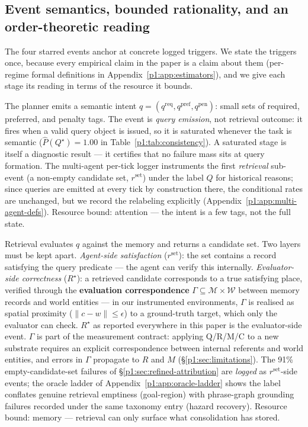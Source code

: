 \documentclass{article}
\begin{document}
\subsection{Event semantics, bounded rationality, and an order-theoretic reading}
\label{p1:sec:event-semantics}

The four starred events anchor at concrete logged triggers. We state the triggers once, because every empirical claim in the paper is a claim about them (per-regime formal definitions in Appendix~\ref{p1:app:estimators}), and we give each stage its reading in terms of the resource it bounds.

\begin{description}[leftmargin=10pt,topsep=2pt,itemsep=2pt]
\item[$Q^\star$ (intent issued).] The planner emits a semantic intent $q=(q^{\mathrm{req}},q^{\mathrm{pref}},q^{\mathrm{pen}})$: small sets of required, preferred, and penalty tags. The event is \emph{query emission}, not retrieval outcome: it fires when a valid query object is issued, so it is saturated whenever the task is semantic ($\hat P(Q^\star){=}1.00$ in Table~\ref{p1:tab:consistency}). A saturated stage is itself a diagnostic result --- it certifies that no failure mass sits at query formation. The multi-agent per-tick logger instruments the first \emph{retrieval} sub-event (a non-empty candidate set, $r^{\mathrm{set}}$) under the label $Q$ for historical reasons; since queries are emitted at every tick by construction there, the conditional rates are unchanged, but we record the relabeling explicitly (Appendix~\ref{p1:app:multi-agent-defs}). Resource bound: attention --- the intent is a few tags, not the full state.
\item[$R^\star$ (memory answers).] Retrieval evaluates $q$ against the memory and returns a candidate set. Two layers must be kept apart. \emph{Agent-side satisfaction} ($r^{\mathrm{set}}$): the set contains a record satisfying the query predicate --- the agent can verify this internally. \emph{Evaluator-side correctness} ($R^\star$): a retrieved candidate corresponds to a true satisfying place, verified through the \textbf{evaluation correspondence} $\Gamma \subseteq \mathcal{M} \times \mathcal{W}$ between memory records and world entities --- in our instrumented environments, $\Gamma$ is realised as spatial proximity ($\|c - w\| \le \epsilon$) to a ground-truth target, which only the evaluator can check. $R^\star$ as reported everywhere in this paper is the evaluator-side event. $\Gamma$ is part of the measurement contract: applying Q/R/M/C to a new substrate requires an explicit correspondence between internal referents and world entities, and errors in $\Gamma$ propagate to $R$ and $M$ (\S\ref{p1:sec:limitations}). The 91\% empty-candidate-set failures of \S\ref{p1:sec:refined-attribution} are \emph{logged} as $r^{\mathrm{set}}$-side events; the oracle ladder of Appendix~\ref{p1:app:oracle-ladder} shows the label conflates genuine retrieval emptiness (goal-region) with phrase-graph grounding failures recorded under the same taxonomy entry (hazard recovery). Resource bound: memory --- retrieval can only surface what consolidation has stored.

\end{description}
\end{document}
